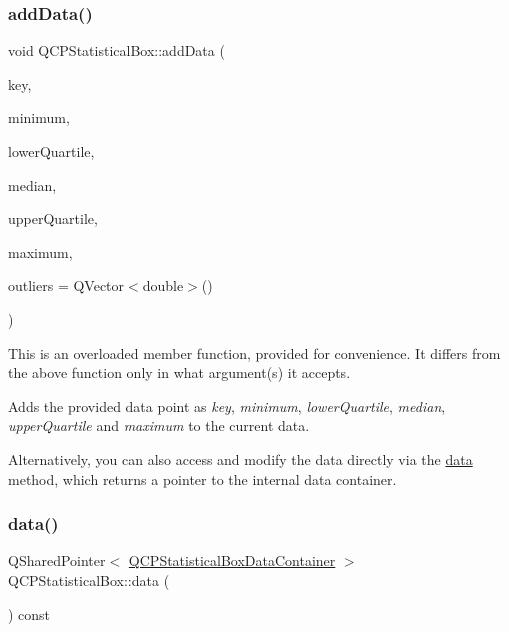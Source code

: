 \subsubsection{\texorpdfstring{add\+Data()}{addData()}\hspace{0.1cm}{\footnotesize\ttfamily [2/2]}}
{\footnotesize\ttfamily void Q\+C\+P\+Statistical\+Box\+::add\+Data (\begin{DoxyParamCaption}\item[{double}]{key,  }\item[{double}]{minimum,  }\item[{double}]{lower\+Quartile,  }\item[{double}]{median,  }\item[{double}]{upper\+Quartile,  }\item[{double}]{maximum,  }\item[{const Q\+Vector$<$ double $>$ \&}]{outliers = {\ttfamily QVector$<$double$>$()} }\end{DoxyParamCaption})}

This is an overloaded member function, provided for convenience. It differs from the above function only in what argument(s) it accepts.

Adds the provided data point as {\itshape key}, {\itshape minimum}, {\itshape lower\+Quartile}, {\itshape median}, {\itshape upper\+Quartile} and {\itshape maximum} to the current data.

Alternatively, you can also access and modify the data directly via the \hyperlink{class_q_c_p_statistical_box_a728e501413eaf191544014173d52dfbc}{data} method, which returns a pointer to the internal data container. \mbox{\label{class_q_c_p_statistical_box_a728e501413eaf191544014173d52dfbc}} 
\subsubsection{\texorpdfstring{data()}{data()}}
{\footnotesize\ttfamily Q\+Shared\+Pointer$<$ \hyperlink{class_q_c_p_data_container}{Q\+C\+P\+Statistical\+Box\+Data\+Container} $>$ Q\+C\+P\+Statistical\+Box\+::data (\begin{DoxyParamCaption}{ }\end{DoxyParamCaption}) const\hspace{0.3cm}{\ttfamily [inline]}}

